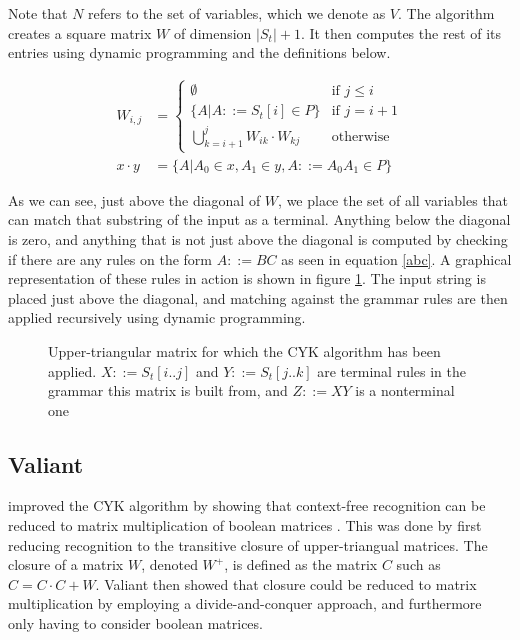 \documentclass[a4paper,12pt,notitlepage]{report}
\renewcommand\cite{\citep}
\newcommand{\subt}[3] { 
  \draw[grid] (#1,#1) -- (#1,#2) node[inChart] {#3} -- (#2,#2);
  \fill[color=black] (#1,#2) circle (2pt)
 }
\newcommand{\mrk}[2]{\node[inChart] at (#1,#1) {#2}}
\begin{document}
Note that $N$ refers to the set of variables, which we denote as $V$. The
algorithm creates a square matrix $W$ of dimension $|S_t|+1$.  It then computes
the rest of its entries using dynamic programming and the definitions below.

\begin{align}
W_{i,j}   &= \begin{cases}
            \emptyset & \mbox{if }j \leq i \\
            \{ A | A ::= S_t[i] \in P \} & \mbox{if }j=i+1 \\
            \displaystyle\bigcup_{k=i+1}^{j} W_{ik} \cdot W_{kj} & \mbox{otherwise}
            \end{cases} \\
x \cdot y &= \{ A | A_0 \in x, A_1 \in y, A ::= A_0A_1 \in P \} \label{abc}
\end{align}

As we can see, just above the diagonal of $W$, we place the set of all variables
that can match that substring of the input as a terminal. Anything below the
diagonal is zero, and anything that is not just above the diagonal is computed
by checking if there are any rules on the form $A ::= BC$ as seen in equation
\ref{abc}. A graphical representation of these rules in action is shown in
figure \ref{exchart}. The input string is placed just above the diagonal, and
matching against the grammar rules are then applied recursively using dynamic
programming. 

\begin{figure}[H]
  \centering
  \caption{\label{exchart}Upper-triangular matrix for which the CYK algorithm
           has been applied. $X ::= S_t[i..j]$ and $Y ::= S_t[j..k]$ are
           terminal rules in the grammar this matrix is built from, and $Z
           ::= XY$ is a nonterminal one} 
\end{figure}

\subsection{Valiant}
\citeauthor{Valiant75} improved the CYK algorithm by showing that
context-free recognition can be reduced to matrix multiplication of boolean
matrices \cite{Valiant75}. This was done by first reducing recognition to the
transitive closure of upper-triangual matrices.  The closure of a matrix $W$,
denoted $W^+$, is defined as the matrix $C$ such as $C = C \cdot C + W$.
Valiant then showed that closure could be reduced to matrix multiplication by
employing a divide-and-conquer approach, and furthermore only having to consider
boolean matrices. 
\end{document}
